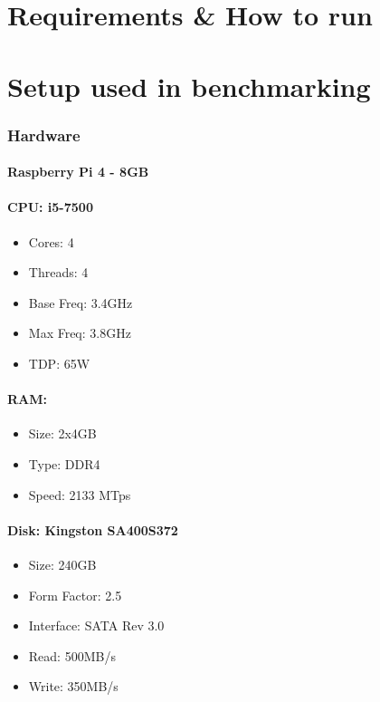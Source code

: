 \documentclass[a4paper, openany]{book}
\begin{document}
\begin{appendix}
\chapter{Requirements \& How to run}
\label{sec:orge0dab25}
\chapter{Setup used in benchmarking}
\label{sec:org037b956}
\label{benchmarksetup}
\begin{minipage}{0.4\textwidth}
\subsection{Hardware}
\subsubsection{Raspberry Pi 4 - 8GB}

\subsubsection{CPU: i5-7500}
\begin{itemize}
\itemsep0em
\item Cores: 4\\
\item Threads: 4\\
\item Base Freq: 3.4GHz\\
\item Max Freq: 3.8GHz\\
\item TDP: 65W
\end{itemize}
\subsubsection{RAM:}
\begin{itemize}
\itemsep0em
\item Size: 2x4GB\\
\item Type: DDR4\\
\item Speed: 2133 MTps\\
\end{itemize}
\subsubsection{Disk: Kingston SA400S372}
\begin{itemize}
\itemsep0em
\item Size: 240GB\\
\item Form Factor: 2.5\\
\item Interface: SATA Rev 3.0\\
\item Read: 500MB/s\\
\item Write: 350MB/s\\
\end{itemize}

\end{minipage}
\end{appendix}
\end{document}
